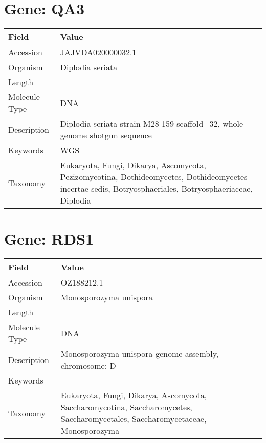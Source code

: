 \documentclass[10pt]{article}
\begin{document}
\vspace{1em}
\section{Gene: QA3}
{\footnotesize
\begin{longtable}{>{\raggedright\arraybackslash}p{4.5cm} >{\raggedright\arraybackslash}p{11.5cm}}
\textbf{Field} & \textbf{Value} \\
\hline
Accession & JAJVDA020000032.1 \\
Organism & Diplodia seriata \\
Length & 390300 \\
Molecule Type & DNA \\
Description & Diplodia seriata strain M28-159 scaffold\_32, whole genome shotgun sequence \\
Keywords & WGS \\
Taxonomy & Eukaryota, Fungi, Dikarya, Ascomycota, Pezizomycotina, Dothideomycetes, Dothideomycetes incertae sedis, Botryosphaeriales, Botryosphaeriaceae, Diplodia \\
\end{longtable}
}

\vspace{1em}
\section{Gene: RDS1}
{\footnotesize
\begin{longtable}{>{\raggedright\arraybackslash}p{4.5cm} >{\raggedright\arraybackslash}p{11.5cm}}
\textbf{Field} & \textbf{Value} \\
\hline
Accession & OZ188212.1 \\
Organism & Monosporozyma unispora \\
Length & 605593 \\
Molecule Type & DNA \\
Description & Monosporozyma unispora genome assembly, chromosome: D \\
Keywords &  \\
Taxonomy & Eukaryota, Fungi, Dikarya, Ascomycota, Saccharomycotina, Saccharomycetes, Saccharomycetales, Saccharomycetaceae, Monosporozyma \\
\end{longtable}
}

\vspace{1em}
\end{document}

